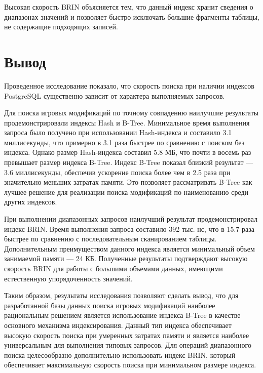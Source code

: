 Высокая скорость BRIN объясняется тем, что данный индекс хранит сведения о диапазонах значений и позволяет быстро исключать большие фрагменты таблицы, не содержащие подходящих записей.

\section{Вывод}

Проведенное исследование показало, что скорость поиска при наличии индексов PostgreSQL существенно зависит от характера выполняемых запросов.

Для поиска игровых модификаций по точному совпадению наилучшие результаты продемонстрировали индексы Hash и B-Tree. Минимальное время выполнения запроса было получено при использовании Hash-индекса и составило 3.1 миллисекунды, что примерно в 3.1 раза быстрее по сравнению с поиском без индекса. Однако размер Hash-индекса составил 5.8 МБ, что почти в восемь раз превышает размер индекса B-Tree. Индекс B-Tree показал близкий результат --- 3.6 миллисекунды, обеспечив ускорение поиска более чем в 2.5 раза при значительно меньших затратах памяти. Это позволяет рассматривать B-Tree как лучшее решение для реализации поиска модификаций по наименованию среди других индексов.

При выполнении диапазонных запросов наилучший результат продемонстрировал индекс BRIN. Время выполнения запроса составило 392 тыс. нс, что в 15.7 раза быстрее по сравнению с последовательным сканированием таблицы. Дополнительным преимуществом данного индекса является минимальный объем занимаемой памяти --- 24 КБ. Полученные результаты подтверждают высокую скорость BRIN для работы с большими объемами данных, имеющими естественную упорядоченность значений.

Таким образом, результаты исследования позволяют сделать вывод, что для разработанной базы данных поиска игровых модификаций наиболее рациональным решением является использование индекса B-Tree в качестве основного механизма индексирования. Данный тип индекса обеспечивает высокую скорость поиска при умеренных затратах памяти и является наиболее универсальным для выполнения типовых запросов. Для операций диапазонного поиска целесообразно дополнительно использовать индекс BRIN, который обеспечивает максимальную скорость поиска при минимальном размере индекса.
